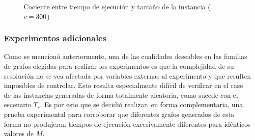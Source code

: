     \begin{figure}[H]
        \centering
        \caption{Cociente entre tiempo de ejecución y tamaño de la instancia
        ($c=300$)}
        \label{fig:exp1:var-m-div-const}
    \end{figure}

    \subsubsection{Experimentos adicionales}

    Como se mencionó anteriormente, una de las cualidades deseables en las
    familias de grafos elegidas para realizar los experimentos es que la
    complejidad de su resolución no se vea afectada por variables externas al
    experimento y que resulten imposibles de controlar. Esto resulta
    especialmente difícil de verificar en el caso de las instancias generadas
    de forma totalmente aleatoria, como sucede con el escenario $T_r$. Es por
    esto que se decidió realizar, en forma complementaria, una prueba
    experimental para corroborar que diferentes grafos generados de esta forma
    no produjeran tiempos de ejecución excesivamente diferentes para idénticos
    valores de $M$.

